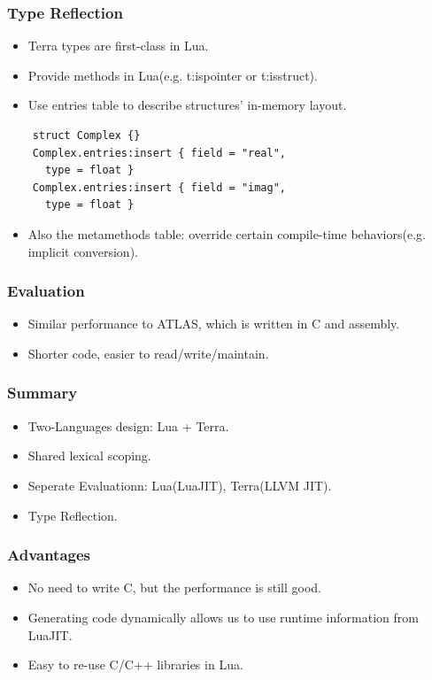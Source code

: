 \documentclass{beamer}
\begin{document}
\begin{frame}[fragile]
	\frametitle{Type Reflection}
  \begin{itemize}
  \item Terra types are first-class in Lua.\pause
  \item Provide methods in Lua(e.g. t:ispointer or t:isstruct).\pause
  \item Use entries table to describe structures' in-memory layout.
  \end{itemize}

  \begin{lstlisting}
    struct Complex {}
    Complex.entries:insert { field = "real",
      type = float }
    Complex.entries:insert { field = "imag",
      type = float }
\end{lstlisting}\pause

  \begin{itemize}
  \item Also the metamethods table: override certain compile-time behaviors(e.g. implicit conversion).
  \end{itemize}
\end{frame}

\begin{frame}
	\frametitle{Evaluation}
  \begin{itemize}
  \item Similar performance to ATLAS, which is written in C and assembly.\pause
  \item Shorter code, easier to read/write/maintain.
  \end{itemize}
\end{frame}

\begin{frame}
	\frametitle{Summary}
  \begin{itemize}
  \item Two-Languages design: Lua + Terra.\pause
  \item Shared lexical scoping.\pause
  \item Seperate Evaluationn: Lua(LuaJIT), Terra(LLVM JIT).\pause
  \item Type Reflection.
  \end{itemize}
\end{frame}

\begin{frame}
	\frametitle{Advantages}
  \begin{itemize}
  \item No need to write C, but the performance is still good.\pause
  \item Generating code dynamically allows us to use runtime information from LuaJIT.\pause
  \item Easy to re-use C/C++ libraries in Lua.\pause
  \end{itemize}
\end{frame}
\end{document}
